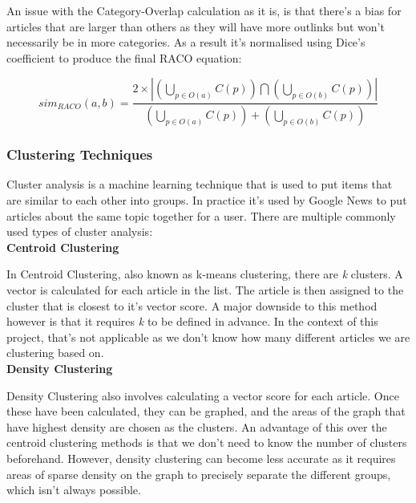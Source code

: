 \documentclass[12pt]{article}
\begin{document}
An issue with the Category-Overlap calculation as it is, is that there's a bias for articles that are larger than others as they will have more outlinks but won't necessarily be in more categories. As a result it's normalised using Dice's coefficient  to produce the final RACO equation:

\[sim_{RACO}(a,b) = \frac{2 \times \left|
\left(\bigcup_{p \in O(a)} C(p)\right) \bigcap \left(\bigcup_{p \in O(b)} C(p)\right)\right|}
{\left(\bigcup_{p \in O(a)} C(p)\right) + \left(\bigcup_{p \in O(b)} C(p)\right)}
\]

\label{TopicLabelingTechniques}

\subsubsection{Clustering Techniques}

\label{ClusteringTechniques}

Cluster analysis is a machine learning technique that is used to put items that are similar to each other into groups. In practice it's used by Google News\cite{googleNews} to put articles about the same topic together for a user\cite{googleClustering}. There are multiple commonly used types of cluster analysis: \\

\textbf{Centroid Clustering}

In Centroid Clustering\cite{clusteringWikipedia}, also known as k-means clustering, there are \emph{k} clusters. A vector is calculated for each article in the list. The article is then assigned to the cluster that is closest to it's vector score. A major downside to this method however is that it requires \emph{k} to be defined in advance. In the context of this project, that's not applicable as we don't know how many different articles we are clustering based on. \\

\textbf{Density Clustering}

Density Clustering\cite{clusteringWikipedia} also involves calculating a vector score for each article. Once these have been calculated, they can be graphed, and the areas of the graph that have highest density are chosen as the clusters. An advantage of this over the centroid clustering methods is that we don't need to know the number of clusters beforehand. However, density clustering can become less accurate as it requires areas of sparse density on the graph to precisely separate the different groups, which isn't always possible. \\
\end{document}
